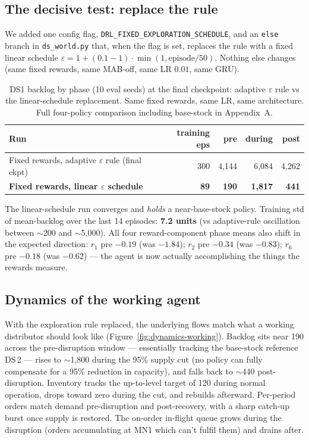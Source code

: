 \documentclass[11pt,letterpaper]{article}
\newcommand{\code}[1]{\texttt{\small #1}}
\begin{document}
\subsection{The decisive test: replace the rule}

We added one config flag, \code{DRL\_FIXED\_EXPLORATION\_SCHEDULE}, and an
\code{else} branch in \code{ds\_world.py} that, when the flag is set,
replaces the rule with a fixed linear schedule
$\varepsilon = 1 + (0.1 - 1)\cdot\min(1, \text{episode}/50)$.  Nothing else
changes (same fixed rewards, same MAB-off, same LR $0.01$, same GRU).

\begin{table}[h!]\centering\small
\begin{tabular}{lrrrr}
\toprule
Run & training eps & \textbf{pre} & during & post \\
\midrule
Fixed rewards, adaptive $\varepsilon$ rule (final ckpt)       & 300 & 4{,}144 & 6{,}084 & 4{,}262 \\
\textbf{Fixed rewards, linear $\varepsilon$ schedule} & \textbf{89} &
\textbf{190} & \textbf{1{,}817} & \textbf{441} \\
\bottomrule
\end{tabular}
\caption{DS1 backlog by phase (10 eval seeds) at the final checkpoint: adaptive
$\varepsilon$ rule vs the linear-schedule replacement.  Same fixed rewards,
same LR, same architecture.  Full four-policy comparison including base-stock
in Appendix~A.}
\end{table}

The linear-schedule run converges and \emph{holds} a near-base-stock policy.
Training std of mean-backlog over the last 14 episodes: \textbf{7.2 units}
(vs adaptive-rule oscillation between $\sim$200 and $\sim$5{,}000).  All four
reward-component phase means also shift in the expected direction: $r_1$
pre $-0.19$ (was $-1.84$); $r_2$ pre $-0.34$ (was $-0.83$); $r_6$ pre $-0.18$
(was $-0.62$) --- the agent is now actually accomplishing the things the
rewards measure.

\subsection{Dynamics of the working agent}

With the exploration rule replaced, the underlying flows match what a working
distributor should look like (Figure~\ref{fig:dynamics-working}).  Backlog
sits near 190 across the pre-disruption window --- essentially tracking the
base-stock reference DS\,2 --- rises to $\sim$1{,}800 during the 95\% supply
cut (no policy can fully compensate for a 95\% reduction in capacity), and
falls back to $\sim$440 post-disruption.  Inventory tracks the up-to-level
target of 120 during normal operation, drops toward zero during the cut, and
rebuilds afterward.  Per-period orders match demand pre-disruption and post-recovery, with a
sharp catch-up burst once supply is restored.  The on-order in-flight queue
grows during the disruption (orders accumulating at MN1 which can't fulfil
them) and drains after.
\end{document}
